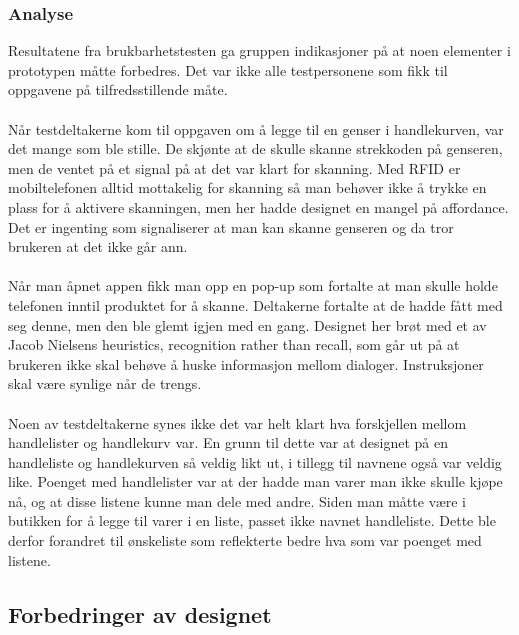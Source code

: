 \subsubsection{Analyse}

Resultatene fra brukbarhetstesten ga gruppen indikasjoner på at noen elementer i prototypen måtte forbedres. Det var ikke alle testpersonene som fikk til oppgavene på tilfredsstillende måte.
\\\\
Når testdeltakerne kom til oppgaven om å legge til en genser i handlekurven, var det mange som ble stille. De skjønte at de skulle skanne strekkoden på genseren, men de ventet på et signal på at det var klart for skanning. Med RFID er mobiltelefonen alltid mottakelig for skanning så man behøver ikke å trykke en plass for å aktivere skanningen, men her hadde designet en mangel på affordance. Det er ingenting som signaliserer at man kan skanne genseren og da tror brukeren at det ikke går ann. 
\\\\
Når man åpnet appen fikk man opp en pop-up som fortalte at man skulle holde telefonen inntil produktet for å skanne. Deltakerne fortalte at de hadde fått med seg denne, men den ble glemt igjen med en gang. Designet her brøt med et av Jacob Nielsens heuristics, recognition rather than recall, som går ut på at brukeren ikke skal behøve å huske informasjon mellom dialoger. Instruksjoner skal være synlige når de trengs\cite[p.~404]{preece}. 
\\\\
Noen av testdeltakerne synes ikke det var helt klart hva forskjellen mellom handlelister og handlekurv var. En grunn til dette var at designet på en handleliste og handlekurven så veldig likt ut, i tillegg til navnene også var veldig like. Poenget med handlelister var at der hadde man varer man ikke skulle kjøpe nå, og at disse listene kunne man dele med andre. Siden man måtte være i butikken for å legge til varer i en liste, passet ikke navnet handleliste. Dette ble derfor forandret til ønskeliste som reflekterte bedre hva som var poenget med listene. 

\subsection{Forbedringer av designet}

